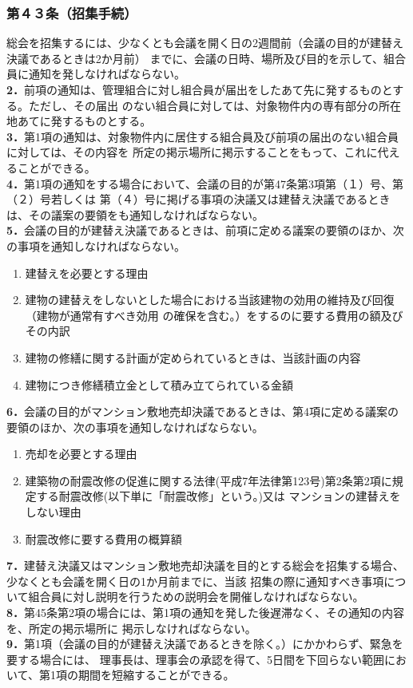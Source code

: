 \documentclass[
  luatex,
  paper=a4paper,
  fontsize=11pt,
  jafontsize=10pt,
  jlreq_notes,
]{jlreq}
\begin{document}
  \subsubsection*{第４３条（招集手続）}
  総会を招集するには、少なくとも会議を開く日の2週間前（会議の目的が建替え決議であるときは2か月前）
  までに、会議の日時、場所及び目的を示して、組合員に通知を発しなければならない。\\
  \textbf{2．}前項の通知は、管理組合に対し組合員が届出をしたあて先に発するものとする。ただし、その届出
  のない組合員に対しては、対象物件内の専有部分の所在地あてに発するものとする。\\
  \textbf{3．}第1項の通知は、対象物件内に居住する組合員及び前項の届出のない組合員に対しては、その内容を
  所定の掲示場所に掲示することをもって、これに代えることができる。\\
  \textbf{4．}第1項の通知をする場合において、会議の目的が第47条第3項第（１）号、第（２）号若しくは
  第（４）号に掲げる事項の決議又は建替え決議であるときは、その議案の要領をも通知しなければならない。\\
  \textbf{5．}会議の目的が建替え決議であるときは、前項に定める議案の要領のほか、次の事項を通知しなければならない。
  \begin{enumerate}
    \item 建替えを必要とする理由
    \item 建物の建替えをしないとした場合における当該建物の効用の維持及び回復（建物が通常有すべき効用
          の確保を含む。）をするのに要する費用の額及びその内訳
    \item 建物の修繕に関する計画が定められているときは、当該計画の内容
    \item 建物につき修繕積立金として積み立てられている金額
  \end{enumerate}
  \textbf{6．}会議の目的がマンション敷地売却決議であるときは、第4項に定める議案の要領のほか、次の事項を通知しなければならない。
  \begin{enumerate}
    \item 売却を必要とする理由
    \item 建築物の耐震改修の促進に関する法律(平成7年法律第123号)第2条第2項に規定する耐震改修(以下単に「耐震改修」という。)又は
      マンションの建替えをしない理由
    \item 耐震改修に要する費用の概算額
  \end{enumerate}
  \textbf{7．}建替え決議又はマンション敷地売却決議を目的とする総会を招集する場合、少なくとも会議を開く日の1か月前までに、当該
  招集の際に通知すべき事項について組合員に対し説明を行うための説明会を開催しなければならない。\\
  \textbf{8．}第45条第2項の場合には、第1項の通知を発した後遅滞なく、その通知の内容を、所定の掲示場所に
  掲示しなければならない。\\
  \textbf{9．}第1項（会議の目的が建替え決議であるときを除く。）にかかわらず、緊急を要する場合には、
  理事長は、理事会の承認を得て、5日間を下回らない範囲において、第1項の期間を短縮することができる。\\
\end{document}
